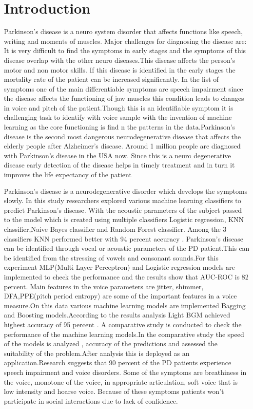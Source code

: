 \documentclass[conference]{IEEEtran}
\begin{document}
\section{Introduction}
Parkinson’s disease is a neuro system disorder that affects functions like speech, writing and moments of muscles. Major challenges for diagnosing the disease are: It is very difficult to  find the symptoms in early stages and the symptoms of this disease overlap with the other neuro diseases.This disease affects the person’s motor and non motor skills. If this disease is identified in the early stages the mortality rate of the patient can be increased significantly. In the list of symptoms one of the main differentiable symptoms are speech impairment since the disease affects the functioning of jaw muscles this condition leads to changes in voice and pitch of the patient.Though this is an identifiable symptom it is challenging task to identify with voice sample with the invention of machine learning as the core functioning is find n the patterns in the data.Parkinson’s disease is the second most  dangerous neurodegenerative disease that affects the elderly people after Alzheimer's disease. Around 1 million people are diagnosed with Parkinson's disease in the USA now. Since this is a neuro degenerative disease early detection of the disease helps in timely treatment and in turn it improves the life expectancy of the patient

Parkinson’s disease is a neurodegenerative disorder which develops the symptoms slowly. In this study researchers explored various machine learning classifiers to predict Parkinson's disease. With the acoustic parameters of the subject passed to the model which is created using multiple classifiers Logistic regression, KNN classifier,Naive Bayes classifier  and Random Forest classifier. Among the 3 classifiers KNN performed better with 94 percent accuracy .
Parkinson's disease can be identified through vocal or acoustic parameters of the PD patient.This can be identified from the stressing of vowels and consonant sounds.For this experiment MLP(Multi Layer Perceptron) and Logistic regression models are implemented to check the performance and the results show that AUC-ROC is 82 percent.
Main features in the voice parameters are jitter, shimmer, DFA,PPE(pitch period entropy) are some of the important features in a voice measure.On this data various machine learning models are implemented Bagging and Boosting models.According to the results analysis Light BGM achieved highest accuracy of 95 percent .
A comparative study is conducted to check the performance of the machine learning models.In the comparative study the speed of the models is analyzed , accuracy of the predictions and assessed  the suitability of the problem.After analysis this is deployed as an application.Research suggests that 90 percent of the PD patients experience speech impairment and voice disorders. Some of the symptoms are breathiness in the voice, monotone of the voice, in appropriate articulation, soft voice that is low intensity and hoarse voice. Because of these symptoms patients won’t participate in social interactions due to lack of confidence.
\end{document}
